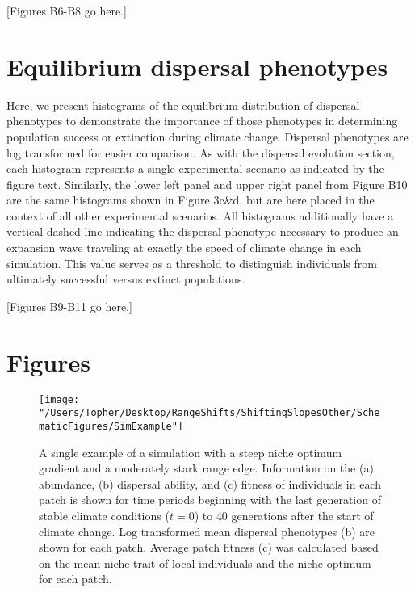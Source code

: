\documentclass[11pt]{article}
\begin{document}
[Figures B6-B8 go here.]

\section*{Equilibrium dispersal phenotypes}
Here, we present histograms of the equilibrium distribution of dispersal phenotypes to demonstrate the importance of those phenotypes in determining population success or extinction during climate change. Dispersal phenotypes are log transformed for easier comparison. As with the dispersal evolution section, each histogram represents a single experimental scenario as indicated by the figure text. Similarly, the lower left panel and upper right panel from Figure B10 are the same histograms shown in Figure 3c\&d, but are here placed in the context of all other experimental scenarios. All histograms additionally have a vertical dashed line indicating the dispersal phenotype necessary to produce an expansion wave traveling at exactly the speed of climate change in each simulation. This value serves as a threshold to distinguish individuals from ultimately successful versus extinct populations.

[Figures B9-B11 go here.]

\newpage{}





\newpage{}

\section*{Figures}

\begin{figure}[h!]
\texttt{[image: "/Users/Topher/Desktop/RangeShifts/ShiftingSlopesOther/SchematicFigures/SimExample"]}
\caption{A single example of a simulation with a steep niche optimum gradient and a moderately stark range edge. Information on the (a) abundance, (b) dispersal ability, and (c) fitness of individuals in each patch is shown for time periods beginning with the last generation of stable climate conditions ($t = 0$) to $40$ generations after the start of climate change. Log transformed mean dispersal phenotypes (b) are shown for each patch. Average patch fitness (c) was calculated based on the mean niche trait of local individuals and the niche optimum for each patch.}
\label{fig:SimExample}
\end{figure}
\end{document}
